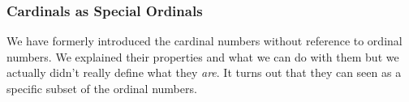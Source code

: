 



\subsubsection{Cardinals as Special Ordinals}
We have formerly introduced the cardinal numbers without reference to ordinal numbers. We explained their properties and what we can do with them but we actually didn't really define what they \emph{are}. It turns out that they can seen as a specific subset of the ordinal numbers.



